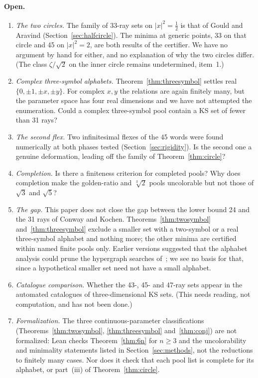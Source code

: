 \paragraph{Open.}
\begin{enumerate}[resume]
\item \emph{The two circles.}  The family of 33-ray sets on $|x|^2=\tfrac12$ is that of Gould
and Aravind (Section~\ref{sec:halfcircle}).  The minima at generic points, 33 on that circle and
45 on $|x|^2=2$, are both results of the certifier.  We have no argument by hand for either, and
no explanation of why the two circles differ.  (The class $\zeta/\sqrt2$ on the inner circle
remains undetermined, item~1.)
\item \emph{Complex three-symbol alphabets.}  Theorem~\ref{thm:threesymbol} settles real
$\{0,\pm1,\pm x,\pm y\}$.  For complex $x,y$ the relations are again finitely many, but the
parameter space has four real dimensions and we have not attempted the enumeration.  Could a
complex three-symbol pool contain a KS set of fewer than 31 rays?
\item \emph{The second flex.}  Two infinitesimal flexes of the 45 words were found numerically
at both phases tested (Section~\ref{sec:rigidity}).  Is the second one a genuine deformation, leading off the
family of Theorem~\ref{thm:circle}?
\item \emph{Completion.}  Is there a finiteness criterion for completed pools?  Why does
completion make the golden-ratio and $\sqrt[3]2$ pools uncolorable but not those of $\sqrt3$ and
$\sqrt5$?
\item \emph{The gap.}  This paper does not close the gap between the lower bound 24 and
the 31 rays of Conway and Kochen.  Theorems~\ref{thm:twosymbol} and~\ref{thm:threesymbol} exclude a
smaller set with a two-symbol or a real three-symbol alphabet and nothing more; the other minima are certified within named finite pools
only.  Earlier
versions suggested that the alphabet analysis could prune the hypergraph searches
of~\cite{LiBrightGanesh2024,KirchwegerPeitlSzeider2023}; we see no basis for that, since a
hypothetical smaller set need not have a small alphabet.
\item \emph{Catalogue comparison.}  Whether the 43-, 45- and 47-ray sets appear in the automated
catalogues of three-dimensional KS sets.  (This needs reading, not computation, and has not been
done.)
\item \emph{Formalization.}  The three continuous-parameter classifications
(Theorems~\ref{thm:twosymbol}, \ref{thm:threesymbol} and~\ref{thm:conj}) are not formalized:
Lean checks Theorem~\ref{thm:6n} for $n\ge3$ and the uncolorability and minimality statements
listed in Section~\ref{sec:methods}, not the reductions to finitely many cases.  Nor does it check that each pool list is complete for its alphabet, or
part~(iii) of Theorem~\ref{thm:circle}.
\end{enumerate}

